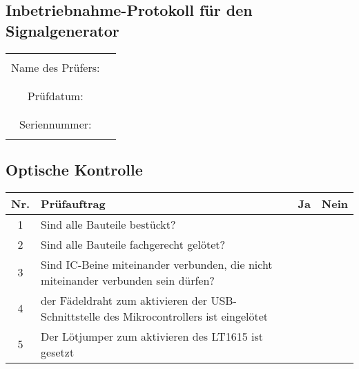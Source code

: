 \begin{center}
\section{Inbetriebnahme-Protokoll für den Signalgenerator}

	\begin{tabular}{|c|p{10cm}|}
		\hline
		& \\
		Name des Prüfers: &  \\
		& \\
		\hline
		& \\
		Prüfdatum: & \\
		& \\
		\hline
		& \\
		Seriennummer: & \\
		& \\
		\hline
	\end{tabular}
\end{center}

\subsection{Optische Kontrolle}

\begin{flushleft}
	\begin{tabular}{|c||p{10cm}|c|c|}
		\hline
		Nr. & Prüfauftrag & Ja & Nein \\
		\hline
		1 & Sind alle Bauteile bestückt? & & \\
		\hline
		2 & Sind alle Bauteile fachgerecht gelötet? & & \\
		\hline
		3 & Sind IC-Beine miteinander verbunden, die nicht miteinander verbunden sein dürfen? & & \\
		\hline
		4 & der Fädeldraht zum aktivieren der USB-Schnittstelle des Mikrocontrollers ist eingelötet & & \\
		\hline
		5 & Der Lötjumper zum aktivieren des LT1615 ist gesetzt & & \\
		\hline
	\end{tabular}
\end{flushleft}


